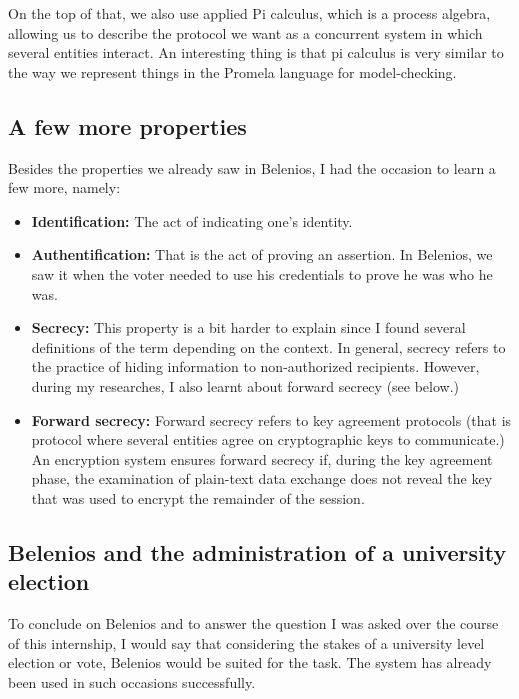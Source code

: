 \documentclass[12pt, a4paper]{report}
\begin{document}
On the top of that, we also use applied Pi calculus, which is a process algebra, allowing us to describe the protocol we want as a concurrent system in which several entities interact. An interesting thing is that pi calculus is very similar to the way we represent things in the Promela language for model-checking. 

\subsection{A few more properties}

Besides the properties we already saw in Belenios, I had the occasion to learn a few more, namely:

\begin{itemize}

\item \textbf{Identification:} The act of indicating one's identity. 

\item \textbf{Authentification:} That is the act of proving an assertion. In Belenios, we saw it when the voter needed to use his credentials to prove he was who he was.

\item \textbf{Secrecy:} This property is a bit harder to explain since I found several definitions of the term depending on the context. In general, secrecy refers to the practice of hiding information to non-authorized recipients. However, during my researches, I also learnt about forward secrecy (see below.)

\item \textbf{Forward secrecy:} Forward secrecy refers to key agreement protocols (that is protocol where several entities agree on cryptographic keys to communicate.) An encryption system ensures forward secrecy if, during the key agreement phase, the examination of plain-text data exchange does not reveal the key that was used to encrypt the remainder of the session.

\end{itemize}

\subsection{Belenios and the administration of a university election}

To conclude on Belenios and to answer the question I was asked over the course of this internship, I would say that considering the stakes of a university level election or vote, Belenios would be suited for the task. The system has already been used in such occasions successfully.\\ 
\end{document}
